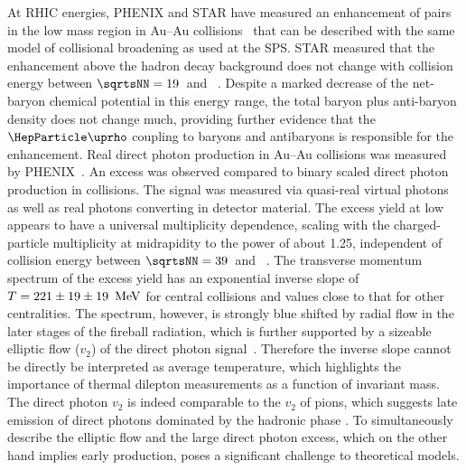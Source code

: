 \documentclass[../report.tex]{subfiles}
\begin{document}
At RHIC energies, PHENIX and STAR have measured an enhancement of \Pepem pairs in the low mass region in Au--Au collisions~\cite{Adare:2009qk,Adare:2015ila,Adamczyk:2013caa,Adamczyk:2015mmx} that can be described with the same model of collisional broadening as used at the SPS. STAR measured that the enhancement above the hadron decay background does not change with collision energy between $\sqrtsNN=\unit[19]{}$ and \unit[200]{\UGeV}~\cite{Adamczyk:2015mmx}. Despite a marked decrease of the net-baryon chemical potential in this energy range, the total baryon plus anti-baryon density does not change much, providing further evidence that the $\PGr$ coupling to baryons and antibaryons is responsible for the enhancement.
Real direct photon production in Au--Au collisions was measured by PHENIX~\cite{Adare:2008ab,Adare:2014fwh,Adare:2018wgc}. An excess was observed compared to binary scaled direct photon production in \pp{} collisions. The signal was measured via quasi-real virtual photons as well as real photons converting in detector material. The excess yield at low \pT{} appears to have a universal multiplicity dependence, scaling with the charged-particle multiplicity at midrapidity to the power of about 1.25, independent of collision energy between $\sqrtsNN = \unit[39]{}$ and \unit[200]{\UGeV}~\cite{Adare:2018wgc}. The transverse momentum spectrum of the excess yield has an exponential inverse slope of $T=\unit[221\pm19\pm19]{\UMeV}$ for central collisions and values close to that for other centralities. The spectrum, however, is strongly blue shifted by radial flow in the later stages of the fireball radiation, which is further supported by a sizeable elliptic flow ($v_2$) of the direct photon signal~\cite{Adare:2011zr}. Therefore the inverse slope cannot be directly be interpreted as average temperature, which highlights the importance of thermal dilepton measurements as a function of invariant mass. The direct photon $v_2$ is indeed comparable to the $v_2$ of pions, which suggests late emission of direct photons dominated by the hadronic phase \cite{vanHees:2011vb}. To simultaneously describe the elliptic flow and the large direct photon excess, which on the other hand implies early production, poses a significant challenge to theoretical models.
\end{document}
